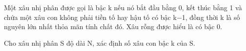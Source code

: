 Một xâu nhị phân được gọi là bậc k nếu nó bắt đầu bằng 0, kết thúc bằng 1 và chứa một xâu con không phải tiền tố hay hậu tố có bậc k−1, đồng thời k là số nguyên lớn nhất thỏa mãn tính chất đó. Xâu rỗng được hiểu là có bậc 0.  

   Cho xâu nhị phân S độ dài N, xác định số xâu con bậc k của S.  

\